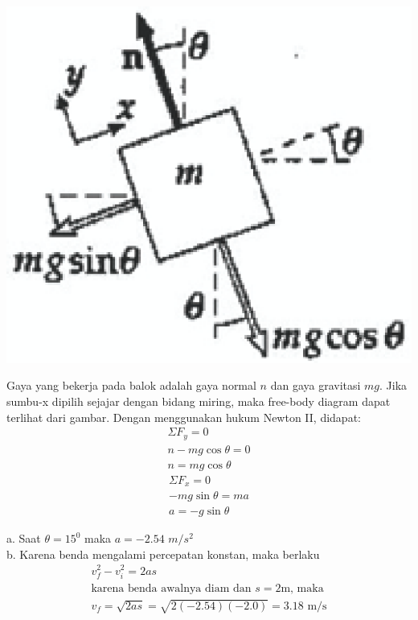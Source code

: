 \begin{solution}
\begin{center}
\includegraphics [scale=0.5]{./latex/eps/1_5_8_image_2.eps}
\end{center}
Gaya yang bekerja pada balok adalah gaya normal $n$ dan gaya gravitasi $mg$. Jika sumbu-x dipilih sejajar dengan bidang miring, maka free-body diagram dapat terlihat dari gambar. Dengan menggunakan hukum Newton II, didapat:
\begin{eqnarray*}
\Sigma F_{y}=0 \\
n-mg\cos\theta=0 \\
n=mg \cos\theta
\end{eqnarray*}
\begin{eqnarray*}
\Sigma F_{x}=0 \\
-mg\sin\theta=ma \\
a=-g \sin\theta
\end{eqnarray*}

a. Saat $\theta=15^{0}$ maka $a=-2.54$ $m/s^{2}$ \\
b. Karena benda mengalami percepatan konstan, maka berlaku
\begin{eqnarray*}
v_{f}^{2}-v_{i}^{2}=2as \\ 
\mbox{karena benda awalnya diam dan $s=2$m, maka} \\
v_{f}=\sqrt{2as}=\sqrt{2(-2.54)(-2.0)}= 3.18 \textrm{ m/s}
\end{eqnarray*} 

\end{solution}
